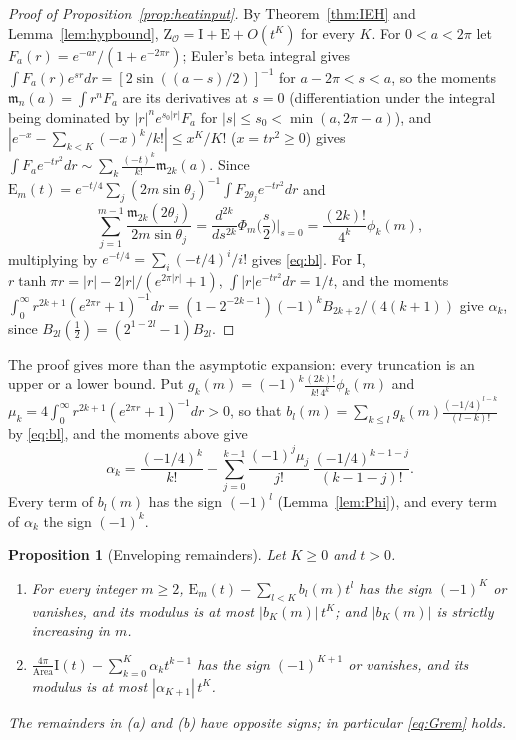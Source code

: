 \documentclass[pdflatex,sn-mathphys-num]{sn-jnl}
\theoremstyle{thmstyleone}%
\newtheorem{proposition}[theorem]{Proposition}%
\theoremstyle{thmstylethree}%
\newcommand{\Orb}{\mathcal{O}}
\newcommand{\Area}{\operatorname{Area}}
\newcommand{\cZ}{\mathrm{Z}}
\begin{document}
\begin{appendices}
\begin{proof}[Proof of Proposition~\ref{prop:heatinput}]
By Theorem~\ref{thm:IEH} and Lemma~\ref{lem:hypbound}, $\cZ_\Orb=\mathrm I+\mathrm E+O(t^K)$ for every $K$. For $0<a<2\pi$ let $F_a(r)=e^{-ar}/(1+e^{-2\pi r})$; Euler's beta integral gives $\int F_a(r)e^{sr}dr=[2\sin((a-s)/2)]^{-1}$ for $a-2\pi<s<a$, so the moments $\mathfrak m_n(a)=\int r^nF_a$ are its derivatives at $s=0$ (differentiation under the integral being dominated by $|r|^ne^{s_0|r|}F_a$ for $|s|\le s_0<\min(a,2\pi-a)$), and $|e^{-x}-\sum_{k<K}(-x)^k/k!|\le x^K/K!$ ($x=tr^2\ge0$) gives $\int F_ae^{-tr^2}dr\sim\sum_k\frac{(-t)^k}{k!}\mathfrak m_{2k}(a)$. Since $\mathrm E_m(t)=e^{-t/4}\sum_j(2m\sin\theta_j)^{-1}\int F_{2\theta_j}e^{-tr^2}dr$ and
\[
  \sum_{j=1}^{m-1}\frac{\mathfrak m_{2k}(2\theta_j)}{2m\sin\theta_j}=\frac{d^{2k}}{ds^{2k}}\Phi_m\Big(\frac s2\Big)\Big|_{s=0}=\frac{(2k)!}{4^k}\phi_k(m),
\]
multiplying by $e^{-t/4}=\sum_i(-t/4)^i/i!$ gives \eqref{eq:bl}. For $\mathrm I$, $r\tanh\pi r=|r|-2|r|/(e^{2\pi|r|}+1)$, $\int|r|e^{-tr^2}dr=1/t$, and the moments $\int_0^\infty r^{2k+1}(e^{2\pi r}+1)^{-1}dr=(1-2^{-2k-1})(-1)^kB_{2k+2}/(4(k+1))$ give $\alpha_k$, since $B_{2l}(\frac12)=(2^{1-2l}-1)B_{2l}$.
\end{proof}

The proof gives more than the asymptotic expansion: every truncation is an upper or a lower bound. Put $g_k(m)=(-1)^k\frac{(2k)!}{k!\,4^k}\phi_k(m)$ and $\mu_k=4\int_0^\infty r^{2k+1}(e^{2\pi r}+1)^{-1}dr>0$, so that $b_l(m)=\sum_{k\le l}g_k(m)\frac{(-1/4)^{l-k}}{(l-k)!}$ by \eqref{eq:bl}, and the moments above give
\[
  \alpha_k=\frac{(-1/4)^k}{k!}-\sum_{j=0}^{k-1}\frac{(-1)^j\mu_j}{j!}\,\frac{(-1/4)^{k-1-j}}{(k-1-j)!} .
\]
Every term of $b_l(m)$ has the sign $(-1)^l$ (Lemma~\ref{lem:Phi}), and every term of $\alpha_k$ the sign $(-1)^k$.

\begin{proposition}[Enveloping remainders]\label{prop:envelope}
Let $K\ge0$ and $t>0$.
\begin{enumerate}[label=(\alph*)]
\item For every integer $m\ge2$, $\mathrm E_m(t)-\sum_{l<K}b_l(m)t^l$ has the sign $(-1)^K$ or vanishes, and its modulus is at most $|b_K(m)|\,t^K$; and $|b_K(m)|$ is strictly increasing in $m$.
\item $\frac{4\pi}{\Area}\mathrm I(t)-\sum_{k=0}^K\alpha_kt^{k-1}$ has the sign $(-1)^{K+1}$ or vanishes, and its modulus is at most $|\alpha_{K+1}|\,t^K$.
\end{enumerate}
The remainders in (a) and (b) have opposite signs; in particular \eqref{eq:Grem} holds.
\end{proposition}


\end{appendices}
\end{document}
